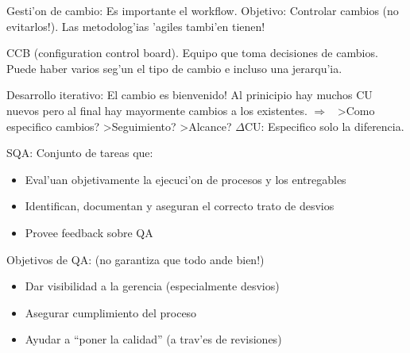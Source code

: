 \documentclass[a4paper,spanish]{article}
\newcommand{\then}[0]{\ensuremath{\Rightarrow}~}
\newenvironment{items}{
		\vspace*{-\topsep}
		\begin{itemize} 
		\addtolength{\itemsep}{-0.5\baselineskip}
		}{\end{itemize}\vspace*{-\topsep}}
\begin{document}
Gesti'on de cambio: Es importante el workflow. Objetivo: Controlar cambios
	(no evitarlos!). Las metodolog'ias 'agiles tambi'en tienen!

CCB (configuration control board). Equipo que toma decisiones de cambios. 
	Puede haber varios seg'un el tipo de cambio e incluso una jerarqu'ia.
	
Desarrollo iterativo: El cambio es bienvenido! Al prinicipio hay muchos CU
	nuevos pero al final hay mayormente cambios a los existentes. \then
	>Como especifico cambios? >Seguimiento? >Alcance? $\Delta$CU: Especifico
	solo la diferencia.
	
SQA: Conjunto de tareas que:
\begin{items}
\item Eval'uan objetivamente la ejecuci'on de procesos y los entregables
\item Identifican, documentan y aseguran el correcto trato de desvios
\item Provee feedback sobre QA
\end{items}

Objetivos de QA: (no garantiza que todo ande bien!)
\begin{items}
\item Dar visibilidad a la gerencia (especialmente desvios)
\item Asegurar cumplimiento del proceso
\item Ayudar a ``poner la calidad'' (a trav'es de revisiones)
\end{items}

\label{theend}
\end{document}
